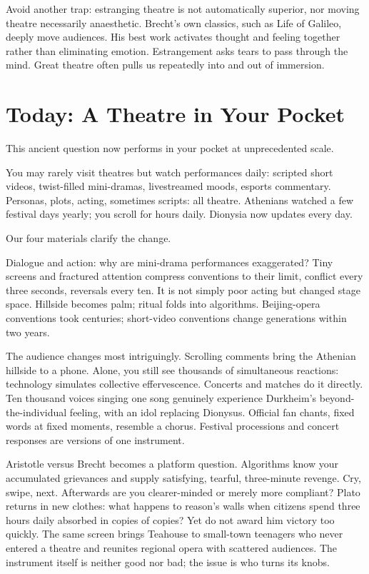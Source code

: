 Avoid another trap: estranging theatre is not automatically superior, nor moving theatre necessarily anaesthetic. Brecht's own classics, such as Life of Galileo, deeply move audiences. His best work activates thought and feeling together rather than eliminating emotion. Estrangement asks tears to pass through the mind. Great theatre often pulls us repeatedly into and out of immersion.

\section{Today: A Theatre in Your Pocket}
This ancient question now performs in your pocket at unprecedented scale.

You may rarely visit theatres but watch performances daily: scripted short videos, twist-filled mini-dramas, livestreamed moods, esports commentary. Personas, plots, acting, sometimes scripts: all theatre. Athenians watched a few festival days yearly; you scroll for hours daily. Dionysia now updates every day.

Our four materials clarify the change.

Dialogue and action: why are mini-drama performances exaggerated? Tiny screens and fractured attention compress conventions to their limit, conflict every three seconds, reversals every ten. It is not simply poor acting but changed stage space. Hillside becomes palm; ritual folds into algorithms. Beijing-opera conventions took centuries; short-video conventions change generations within two years.

The audience changes most intriguingly. Scrolling comments bring the Athenian hillside to a phone. Alone, you still see thousands of simultaneous reactions: technology simulates collective effervescence. Concerts and matches do it directly. Ten thousand voices singing one song genuinely experience Durkheim's beyond-the-individual feeling, with an idol replacing Dionysus. Official fan chants, fixed words at fixed moments, resemble a chorus. Festival processions and concert responses are versions of one instrument.

Aristotle versus Brecht becomes a platform question. Algorithms know your accumulated grievances and supply satisfying, tearful, three-minute revenge. Cry, swipe, next. Afterwards are you clearer-minded or merely more compliant? Plato returns in new clothes: what happens to reason's walls when citizens spend three hours daily absorbed in copies of copies? Yet do not award him victory too quickly. The same screen brings Teahouse to small-town teenagers who never entered a theatre and reunites regional opera with scattered audiences. The instrument itself is neither good nor bad; the issue is who turns its knobs.

